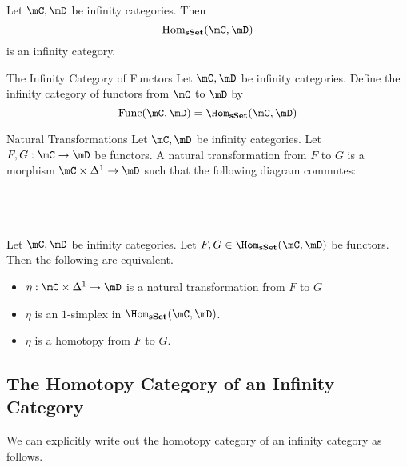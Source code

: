 \documentclass[a4paper]{article}
\begin{document}
\begin{prp}{}{} Let $\mC,\mD$ be infinity categories. Then $$\text{Hom}_\bold{sSet}(\mC,\mD)$$ is an infinity category. 
\end{prp}

\begin{defn}{The Infinity Category of Functors}{} Let $\mC,\mD$ be infinity categories. Define the infinity category of functors from $\mC$ to $\mD$ by $$\text{Func}(\mC,\mD)=\Hom_\bold{sSet}(\mC,\mD)$$
\end{defn}

\begin{defn}{Natural Transformations}{} Let $\mC,\mD$ be infinity categories. Let $F,G:\mC\to\mD$ be functors. A natural transformation from $F$ to $G$ is a morphism $\mC\times\Delta^1\to\mD$ such that the following diagram commutes: \\~\\
\\~\\
\end{defn}

\begin{lmm}{}{} Let $\mC,\mD$ be infinity categories. Let $F,G\in\Hom_\bold{sSet}(\mC,\mD)$ be functors. Then the following are equivalent. 
\begin{itemize}
\item $\eta:\mC\times\Delta^1\to\mD$ is a natural transformation from $F$ to $G$
\item $\eta$ is an $1$-simplex in $\Hom_\bold{sSet}(\mC,\mD)$. 
\item $\eta$ is a homotopy from $F$ to $G$. 
\end{itemize}
\end{lmm}

\subsection{The Homotopy Category of an Infinity Category}
We can explicitly write out the homotopy category of an infinity category as follows. 
\end{document}
